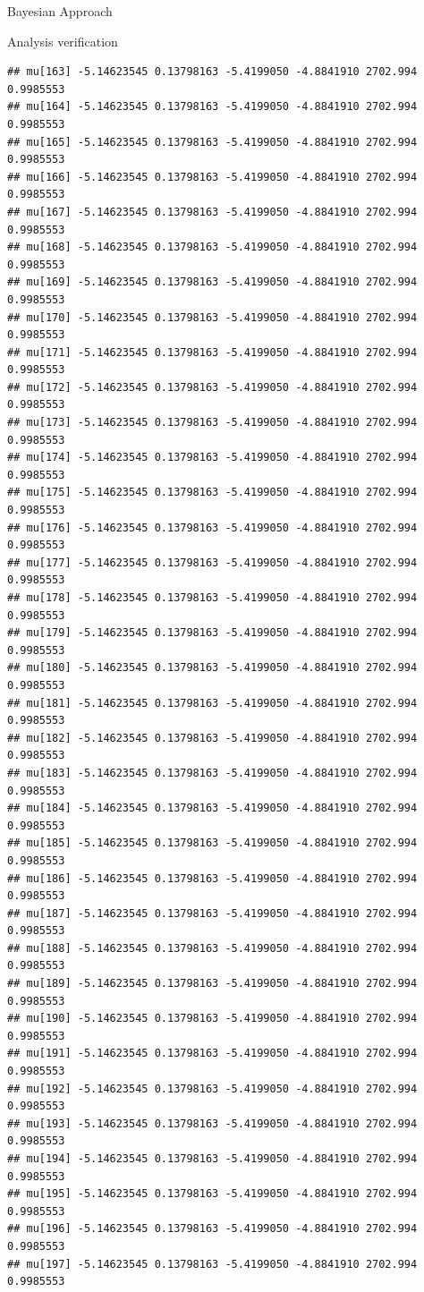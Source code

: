 \documentclass[
  ignorenonframetext,
]{beamer}
\begin{document}
\begin{frame}[fragile]{Bayesian Approach}
\begin{block}{Analysis verification}
\begin{verbatim}
## mu[163] -5.14623545 0.13798163 -5.4199050 -4.8841910 2702.994 0.9985553
## mu[164] -5.14623545 0.13798163 -5.4199050 -4.8841910 2702.994 0.9985553
## mu[165] -5.14623545 0.13798163 -5.4199050 -4.8841910 2702.994 0.9985553
## mu[166] -5.14623545 0.13798163 -5.4199050 -4.8841910 2702.994 0.9985553
## mu[167] -5.14623545 0.13798163 -5.4199050 -4.8841910 2702.994 0.9985553
## mu[168] -5.14623545 0.13798163 -5.4199050 -4.8841910 2702.994 0.9985553
## mu[169] -5.14623545 0.13798163 -5.4199050 -4.8841910 2702.994 0.9985553
## mu[170] -5.14623545 0.13798163 -5.4199050 -4.8841910 2702.994 0.9985553
## mu[171] -5.14623545 0.13798163 -5.4199050 -4.8841910 2702.994 0.9985553
## mu[172] -5.14623545 0.13798163 -5.4199050 -4.8841910 2702.994 0.9985553
## mu[173] -5.14623545 0.13798163 -5.4199050 -4.8841910 2702.994 0.9985553
## mu[174] -5.14623545 0.13798163 -5.4199050 -4.8841910 2702.994 0.9985553
## mu[175] -5.14623545 0.13798163 -5.4199050 -4.8841910 2702.994 0.9985553
## mu[176] -5.14623545 0.13798163 -5.4199050 -4.8841910 2702.994 0.9985553
## mu[177] -5.14623545 0.13798163 -5.4199050 -4.8841910 2702.994 0.9985553
## mu[178] -5.14623545 0.13798163 -5.4199050 -4.8841910 2702.994 0.9985553
## mu[179] -5.14623545 0.13798163 -5.4199050 -4.8841910 2702.994 0.9985553
## mu[180] -5.14623545 0.13798163 -5.4199050 -4.8841910 2702.994 0.9985553
## mu[181] -5.14623545 0.13798163 -5.4199050 -4.8841910 2702.994 0.9985553
## mu[182] -5.14623545 0.13798163 -5.4199050 -4.8841910 2702.994 0.9985553
## mu[183] -5.14623545 0.13798163 -5.4199050 -4.8841910 2702.994 0.9985553
## mu[184] -5.14623545 0.13798163 -5.4199050 -4.8841910 2702.994 0.9985553
## mu[185] -5.14623545 0.13798163 -5.4199050 -4.8841910 2702.994 0.9985553
## mu[186] -5.14623545 0.13798163 -5.4199050 -4.8841910 2702.994 0.9985553
## mu[187] -5.14623545 0.13798163 -5.4199050 -4.8841910 2702.994 0.9985553
## mu[188] -5.14623545 0.13798163 -5.4199050 -4.8841910 2702.994 0.9985553
## mu[189] -5.14623545 0.13798163 -5.4199050 -4.8841910 2702.994 0.9985553
## mu[190] -5.14623545 0.13798163 -5.4199050 -4.8841910 2702.994 0.9985553
## mu[191] -5.14623545 0.13798163 -5.4199050 -4.8841910 2702.994 0.9985553
## mu[192] -5.14623545 0.13798163 -5.4199050 -4.8841910 2702.994 0.9985553
## mu[193] -5.14623545 0.13798163 -5.4199050 -4.8841910 2702.994 0.9985553
## mu[194] -5.14623545 0.13798163 -5.4199050 -4.8841910 2702.994 0.9985553
## mu[195] -5.14623545 0.13798163 -5.4199050 -4.8841910 2702.994 0.9985553
## mu[196] -5.14623545 0.13798163 -5.4199050 -4.8841910 2702.994 0.9985553
## mu[197] -5.14623545 0.13798163 -5.4199050 -4.8841910 2702.994 0.9985553

\end{verbatim}
\end{block}
\end{frame}
\end{document}
